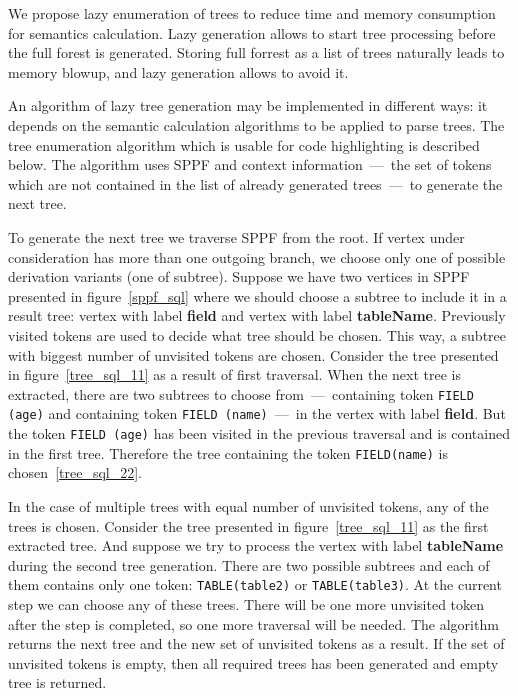 \documentclass{acm_proc_article-sp}
\begin{document}
We propose lazy enumeration of trees to reduce time and memory consumption for semantics calculation. Lazy generation allows to start tree processing before the full forest is generated. Storing full forrest as a list of trees naturally leads to memory blowup, and lazy generation allows to avoid it. 

An algorithm of lazy tree generation may be implemented in different ways: it depends on the semantic calculation algorithms to be applied to parse trees. The tree enumeration algorithm which is usable for code highlighting is described below. The algorithm uses SPPF and context information~---~the set of tokens which are not contained in the list of already generated trees~---~to generate the next tree. 

To generate the next tree we traverse SPPF from the root. If vertex under consideration has more than one outgoing branch, we choose only one of possible derivation variants (one of subtree). Suppose we have two vertices in SPPF presented in figure~\ref{sppf_sql} where we should choose a subtree to include it in a result tree: vertex with label {\bf field} and vertex with label {\bf tableName}. Previously visited tokens are used to decide what tree should be chosen. This way, a subtree with biggest number of unvisited tokens are chosen. Consider the tree presented in figure~\ref{tree_sql_11} as a result of first traversal. When the next tree is extracted, there are two subtrees to choose from~---~containing token \verb|FIELD (age)| and containing token \verb|FIELD (name)|~---~in the vertex with label {\bf field}. But the token \verb|FIELD (age)| has been visited in the previous traversal and is contained in the first tree. Therefore the tree containing the token \verb|FIELD(name)| is chosen~\ref{tree_sql_22}.

In the case of multiple trees with equal number of unvisited tokens, any of the trees is chosen. Consider the tree presented in figure~\ref{tree_sql_11} as the first extracted tree. And suppose we try to process the vertex with label {\bf tableName} during the second tree generation. There are two possible subtrees and each of them contains only one token: \verb|TABLE(table2)| or \verb|TABLE(table3)|. At the current step we can choose any of these trees. There will be one more unvisited token after the step is completed, so one more traversal will be needed. The algorithm returns the next tree and the new set of unvisited tokens as a result. If the set of unvisited tokens is empty, then all required trees has been generated and empty tree is returned. 
\end{document}
